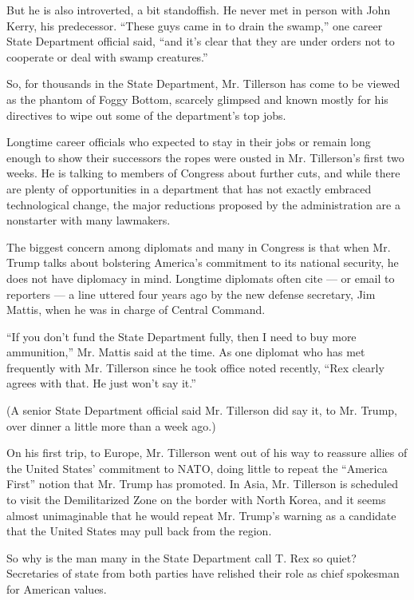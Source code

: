 But he is also introverted, a bit standoffish. He never met in person
with John Kerry, his predecessor. ``These guys came in to drain the
swamp,'' one career State Department official said, ``and it's clear
that they are under orders not to cooperate or deal with swamp
creatures.''

So, for thousands in the State Department, Mr. Tillerson has come to be
viewed as the phantom of Foggy Bottom, scarcely glimpsed and known
mostly for his directives to wipe out some of the department's top jobs.

Longtime career officials who expected to stay in their jobs or remain
long enough to show their successors the ropes were ousted in Mr.
Tillerson's first two weeks. He is talking to members of Congress about
further cuts, and while there are plenty of opportunities in a
department that has not exactly embraced technological change, the major
reductions proposed by the administration are a nonstarter with many
lawmakers.

The biggest concern among diplomats and many in Congress is that when
Mr. Trump talks about bolstering America's commitment to its national
security, he does not have diplomacy in mind. Longtime diplomats often
cite --- or email to reporters --- a line uttered four years ago by the
new defense secretary, Jim Mattis, when he was in charge of Central
Command.

``If you don't fund the State Department fully, then I need to buy more
ammunition,'' Mr. Mattis said at the time. As one diplomat who has met
frequently with Mr. Tillerson since he took office noted recently, ``Rex
clearly agrees with that. He just won't say it.''

(A senior State Department official said Mr. Tillerson did say it, to
Mr. Trump, over dinner a little more than a week ago.)

On his first trip, to Europe, Mr. Tillerson went out of his way to
reassure allies of the United States' commitment to NATO, doing little
to repeat the ``America First'' notion that Mr. Trump has promoted. In
Asia, Mr. Tillerson is scheduled to visit the Demilitarized Zone on the
border with North Korea, and it seems almost unimaginable that he would
repeat Mr. Trump's warning as a candidate that the United States may
pull back from the region.

So why is the man many in the State Department call T. Rex so quiet?
Secretaries of state from both parties have relished their role as chief
spokesman for American values.

